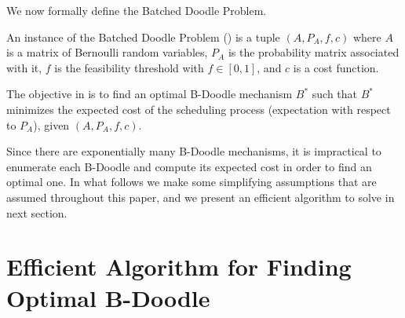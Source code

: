 We now formally define the Batched Doodle Problem.
\begin{definition} \label{bdoodle:def:Problem} %
	An instance of the Batched Doodle Problem (\BDP) is a tuple $(A, P_A, f, c)$
	where $A$ is a matrix of Bernoulli random variables,
	$P_A$ is the probability matrix associated with it,
	$f$ is the feasibility threshold with $f \in [0,1]$,
	and $c$ is a cost function.

	The objective in \BDPs is to find an optimal B-Doodle mechanism $B^*$ such that $B^*$ minimizes the expected cost of the scheduling process (expectation with respect to $P_A$), given $(A, P_A, f, c)$.
\end{definition}

Since there are exponentially many B-Doodle mechanisms, it is impractical to enumerate each B-Doodle and compute its expected cost in order to find an optimal one. In what follows we make some simplifying assumptions that are assumed throughout this paper, and we present an efficient algorithm to solve \BDPs in next section.


\section{Efficient Algorithm for Finding Optimal B-Doodle}


